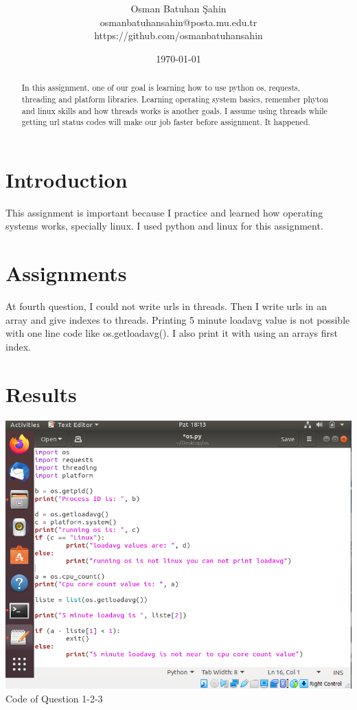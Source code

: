 \documentclass[onecolumn]{article}
\title{\spacecaps{Assignment Report 1: Process and Thread Implementation}\\ \normalsize \spacesc{CENG2034, Operating Systems} }
\author{Osman Batuhan Şahin\\osmanbatuhansahin@posta.mu.edu.tr\\https://github.com/osmanbatuhansahin}
\date{\today}
\begin{document}
\maketitle

\begin{abstract}
In this assignment, one of our goal is learning how to use python os, requests, threading and platform libraries. Learning operating system basics, remember phyton and linux skills and how threads works is another goals. I assume using threads while getting url status codes will make our job faster before assignment. It happened.
\end{abstract}


\section{Introduction}
This assignment is important because I practice and learned how operating systems works, specially linux. I used python and linux for this assignment.

\section{Assignments}
At fourth question, I could not write urls in threads. Then I write urls in an array and give indexes to threads. Printing 5 minute loadavg value is not possible with one line code like os.getloadavg(). I also print it with using an arrays first index.



\section{Results}


\includegraphics[width=\textwidth]{cozum123.PNG}
Code of Question 1-2-3
\end{document}
